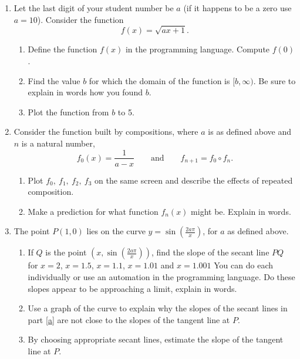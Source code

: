 \documentclass[11pt]{article}
\begin{document}
\begin{enumerate}
\item Let the last digit of your student number be $a$ (if it happens to be a zero use $a=10$).  Consider the function 
\[f(x)=\sqrt{ax+1}.\]
\begin{enumerate}
\item Define the function $f(x)$ in the programming language.  Compute $f(0)$.
\item Find the value $b$ for which the domain of the function is $[b,\infty)$.  Be sure to explain in words how you found $b$.
\item Plot the function from $b$ to 5.

\end{enumerate}
\item Consider the function built by compositions, where $a$ is as defined above and $n$ is a natural number,
\[
f_0(x)=\frac1{a-x}\quad\quad\text{and}\quad\quad f_{n+1}=f_0\circ f_n.
\]
\begin{enumerate}
\item Plot $f_0,\ f_1,\ f_2,\ f_3$ on the same screen and describe the effects of repeated composition.
\item Make a prediction for what function $f_n(x)$ might be.  Explain in words. 
\end{enumerate}
\item The point $P(1,0)$ lies on the curve $y=\sin\left(\frac{2a\pi}x\right)$, for $a$ as defined above.
\begin{enumerate}
\item If $Q$ is the point $\left(x,\sin\left(\frac{2a\pi}x\right)\right)$, find the slope of the secant line $PQ$ for $x=2$, $x=1.5$, $x=1.1$, $x=1.01$ and $x=1.001$  You can do each individually or use an automation in the programming language.  Do these slopes appear to be approaching a limit, explain in words. \label{a}
\item Use a graph of the curve to explain why the slopes of the secant lines in part \ref{a} are not close to the slopes of the tangent line at $P$.
\item By choosing appropriate secant lines, estimate the slope of the tangent line at $P$.
\end{enumerate}
\end{enumerate}
\end{document}
